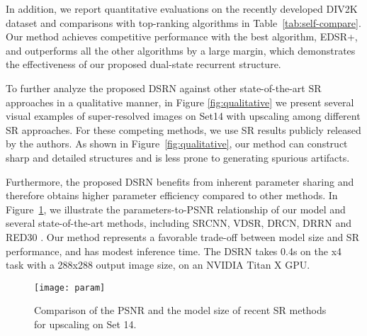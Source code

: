 \documentclass[10pt,twocolumn,letterpaper]{article}
\newcommand{\algname}{DSRN }
\begin{document}
In addition, we report quantitative evaluations on the recently developed DIV2K dataset and comparisons with top-ranking algorithms in Table~\ref{tab:self-compare}. Our method achieves competitive performance with the best algorithm, EDSR+\cite{lim2017enhanced}, and outperforms all the other algorithms by a large margin, which demonstrates the effectiveness of our proposed dual-state recurrent structure.

To further analyze the proposed \algname against other state-of-the-art SR approaches in a qualitative manner, in Figure \ref{fig:qualitative} we present several visual examples of super-resolved images  on Set14 with  upscaling 
among different SR approaches. For these competing methods, we use SR results publicly released by the authors.   As shown in Figure~\ref{fig:qualitative}, our method can construct sharp and detailed structures and is less prone to generating spurious artifacts. 

Furthermore, the proposed \algname benefits from inherent parameter sharing and therefore obtains higher parameter efficiency compared to other methods. In Figure~\ref{fig:parampsnr}, we illustrate the parameters-to-PSNR relationship of our model and several state-of-the-art methods, including SRCNN, VDSR, DRCN, DRRN and RED30 \cite{mao2016image}. Our method represents a favorable trade-off between model size and SR performance, and has modest inference time. The \algname takes 0.4s on the x4 task with a 288x288 output image size, on an NVIDIA Titan X GPU. 

\begin{figure}[t!]
\begin{centering}
\texttt{[image: param]}
\par\end{centering}
\caption{Comparison of the PSNR and the model size of  recent SR methods for   upscaling on Set 14.}
\label{fig:parampsnr}
\end{figure}
\end{document}
